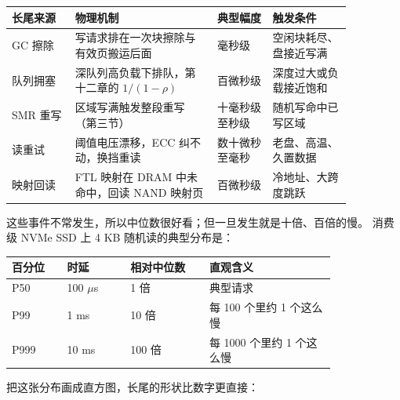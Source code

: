 \begin{longtable}{L{0.16\linewidth}L{0.36\linewidth}L{0.14\linewidth}L{0.20\linewidth}}
\toprule
长尾来源 & 物理机制 & 典型幅度 & 触发条件 \\
\midrule
GC 擦除 & 写请求排在一次块擦除与有效页搬运后面 & 毫秒级 & 空闲块耗尽、盘接近写满 \\
队列拥塞 & 深队列高负载下排队，第十二章的 $1/(1-\rho)$ & 百微秒级 & 深度过大或负载接近饱和 \\
SMR 重写 & 区域写满触发整段重写（第三节） & 十毫秒级至秒级 & 随机写命中已写区域 \\
读重试 & 阈值电压漂移，ECC 纠不动，换挡重读 & 数十微秒至毫秒 & 老盘、高温、久置数据 \\
映射回读 & FTL 映射在 DRAM 中未命中，回读 NAND 映射页 & 百微秒级 & 冷地址、大跨度跳跃 \\
\bottomrule
\end{longtable}

这些事件不常发生，所以中位数很好看；但一旦发生就是十倍、百倍的慢。
消费级 NVMe SSD 上 4 KB 随机读的典型分布是：

\begin{longtable}{L{0.14\linewidth}L{0.16\linewidth}L{0.20\linewidth}L{0.32\linewidth}}
\toprule
百分位 & 时延 & 相对中位数 & 直观含义 \\
\midrule
P50 & 100 $\mu$s & 1 倍 & 典型请求 \\
P99 & 1 ms & 10 倍 & 每 100 个里约 1 个这么慢 \\
P999 & 10 ms & 100 倍 & 每 1000 个里约 1 个这么慢 \\
\bottomrule
\end{longtable}

把这张分布画成直方图，长尾的形状比数字更直接：

